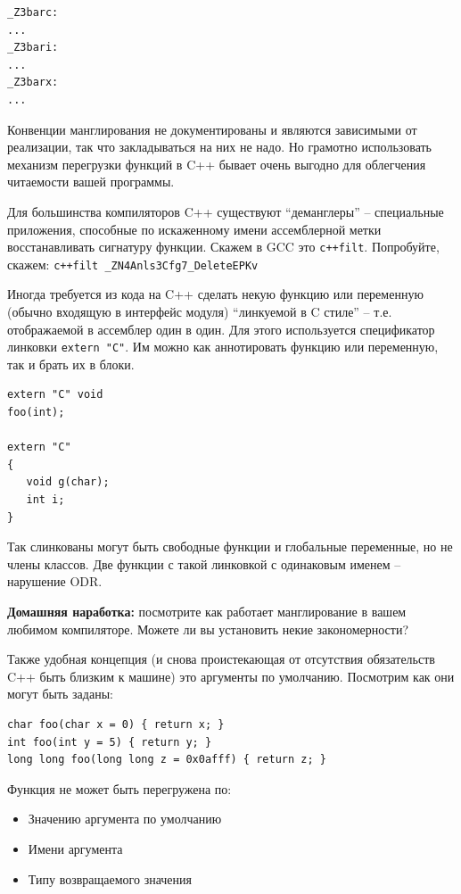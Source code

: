 \documentclass[a4paper,12pt,oneside]{article}
\begin{document}
\begin{verbatim}
_Z3barc:
...
_Z3bari:
...
_Z3barx:
...
\end{verbatim}

Конвенции манглирования не документированы и являются зависимыми от реализации, так что закладываться на них не надо. Но грамотно использовать механизм перегрузки функций в C++ бывает очень выгодно для облегчения читаемости вашей программы.

Для большинства компиляторов C++ существуют ``деманглеры'' -- специальные приложения, способные по искаженному имени ассемблерной метки восстанавливать сигнатуру функции. Скажем в GCC это \lstinline!c++filt!. Попробуйте, скажем: \lstinline!c++filt _ZN4Anls3Cfg7_DeleteEPKv!

Иногда требуется из кода на C++ сделать некую функцию или переменную (обычно входящую в интерфейс модуля) ``линкуемой в C стиле'' -- т.е. отображаемой в ассемблер один в один. Для этого используется спецификатор линковки \lstinline!extern "C"!. Им можно как аннотировать функцию или переменную, так и брать их в блоки.

\begin{lstlisting}
extern "C" void 
foo(int);

extern "C"
{
   void g(char);
   int i;
}
\end{lstlisting}

Так слинкованы могут быть свободные функции и глобальные переменные, но не члены классов. Две функции с такой линковкой с одинаковым именем -- нарушение ODR.

\textbf{Домашняя наработка:} посмотрите как работает манглирование в вашем любимом компиляторе. Можете ли вы установить некие закономерности?

Также удобная концепция (и снова проистекающая от отсутствия обязательств C++ быть близким к машине) это аргументы по умолчанию. Посмотрим как они могут быть заданы:

\begin{lstlisting}
char foo(char x = 0) { return x; }
int foo(int y = 5) { return y; }
long long foo(long long z = 0x0afff) { return z; }
\end{lstlisting}

Функция не может быть перегружена по: 

\begin{itemize}
\item Значению аргумента по умолчанию
\item Имени аргумента
\item Типу возвращаемого значения
\end{itemize}
\end{document}

